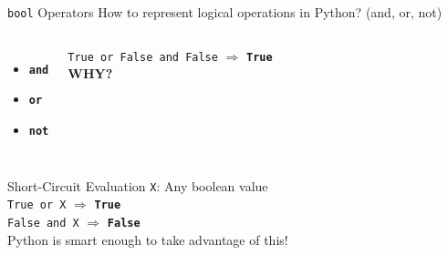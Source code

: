         \begin{frame}{\texttt{bool} Operators}
         \LARGE
            How to represent logical operations in Python? (and, or, not)
            \begin{table}[]
            \end{table}
            \begin{columns}
                    \begin{itemize}
                        \item \textbf{\texttt{and}}
                        \item \textbf{\texttt{or}}
                        \item \textbf{\texttt{not}}
                    \end{itemize}
                   \texttt{True or False and False} $\Rightarrow$ 
                   \textbf{\texttt{True}} \\
                   \Huge
                   \textbf{WHY?}
             \end{columns}
        
        \end{frame}

        \begin{frame}{Short-Circuit Evaluation}
            \LARGE
            \texttt{X}: Any boolean value\\
            \texttt{True or X} $\Rightarrow$ 
            \textbf{\texttt{True}}\\
            \texttt{False and X} $\Rightarrow$
            \textbf{\texttt{False}}\\
            Python is smart enough to take advantage of this!
            \inputminted[frame=single,framesep=2pt]{python3}{../Lecture2/code-examples/short_circuit.py}
        \end{frame}

